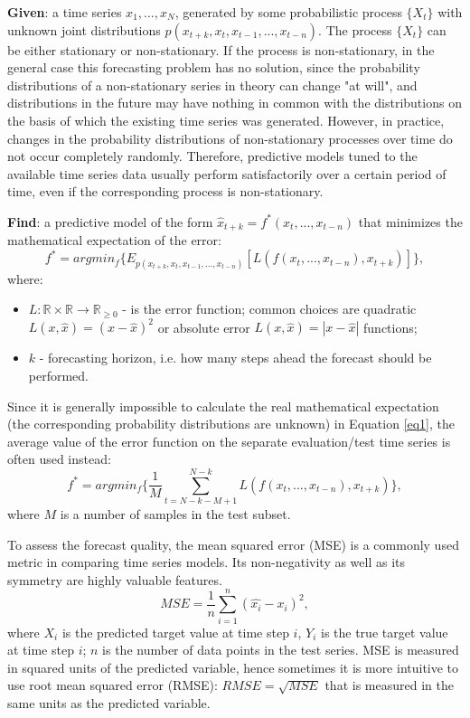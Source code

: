 \documentclass[sn-apa]{sn-jnl}%
\begin{document}
\textbf{Given}: a time series ${x_1, ..., x_N}$, generated by some probabilistic process $ \{X_t\} $ with unknown joint distributions $p(x_{t+k}, x_{t}, x_{t-1}, ..., x_{t-n})$. The process $ \{X_t\} $ can be either stationary or non-stationary. If the process is non-stationary, in the general case this forecasting problem has no solution, since the probability distributions of a non-stationary series in theory can change "at will", and distributions in the future may have nothing in common with the distributions on the basis of which the existing time series was generated. However, in practice, changes in the probability distributions of non-stationary processes over time do not occur completely randomly. Therefore, predictive models tuned to the available time series data usually perform satisfactorily over a certain period of time, even if the corresponding process is non-stationary. 

\textbf{Find}: a predictive model of the form $ \hat{x}_{t+k} = f^*(x_{t}, ..., x_{t-n}) $ that minimizes the mathematical expectation of the error:
\begin{equation}
f^* = argmin_f
	\{ E_{p(x_{t+k}, x_{t}, x_{t-1}, ..., x_{t-n})} [ L(f(x_{t}, ..., x_{t-n}), x_{t+k}) ] \},\label{eq1}
\end{equation}
where:

\begin{itemize}
\item $L: \mathbb{R} \times \mathbb{R} \to \mathbb{R}_{\geq 0} $ - is the error function; common choices are quadratic $ L(x, \hat{x}) = (x-\hat{x})^2 $ or absolute error $ L(x, \hat{x}) = |x-\hat{x}| $ functions;
\item $k$ - forecasting horizon, i.e. how many steps ahead the forecast should be performed.
\end{itemize}

Since it is generally impossible to calculate the real mathematical expectation (the corresponding probability distributions are unknown) in Equation \ref{eq1}, the average value of the error function on the separate evaluation/test time series is often used instead:
\begin{equation}
f^* = argmin_f \{ \frac{1}{M} \sum_{t=N-k-M+1}^{N - k}{L(f(x_t, ..., x_{t-n}), x_{t+k})} \},\label{eq2}
\end{equation}
where $M$ is a number of samples in the test subset.
 
To assess the forecast quality, the mean squared error (MSE) is a commonly used metric in comparing time series models. Its non-negativity as well as its symmetry are highly valuable features.
\begin{equation}
MSE = \frac{1}{n}\sum_{i=1}^{n}{(\hat{x_i} - x_i)^2},\label{eq3}
\end{equation}
where $X_i$ is the predicted target value at time step $i$, $Y_i$ is the true target value at time step $i$; $n$ is the number of data points in the test series. MSE is measured in squared units of the predicted variable, hence sometimes it is more intuitive to use root mean squared error (RMSE): $RMSE=\sqrt{MSE}$ that is measured in the same units as the predicted variable.
  
\end{document}
